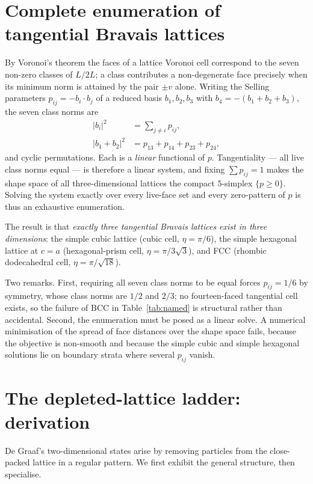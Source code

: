 \documentclass[aps,prl,twocolumn,superscriptaddress,floatfix]{revtex4-2}
\begin{document}
\section{Complete enumeration of tangential Bravais lattices}
\label{sec:enum}

By Voronoi's theorem the faces of a lattice Voronoi cell correspond to the seven
non-zero classes of $L/2L$; a class contributes a non-degenerate face precisely
when its minimum norm is attained by the pair $\pm v$ alone. Writing the Selling
parameters $p_{ij}=-b_i\cdot b_j$ of a reduced basis $b_1,b_2,b_3$ with
$b_4=-(b_1+b_2+b_3)$, the seven class norms are
\begin{align}
|b_i|^2 &= \textstyle\sum_{j\neq i} p_{ij},\\
|b_1+b_2|^2 &= p_{13}+p_{14}+p_{23}+p_{24},
\end{align}
and cyclic permutations. Each is a \emph{linear} functional of $p$. Tangentiality
--- all live class norms equal --- is therefore a linear system, and fixing
$\sum p_{ij}=1$ makes the shape space of all three-dimensional lattices the
compact $5$-simplex $\{p\geq0\}$. Solving the system exactly over every live-face
set and every zero-pattern of $p$ is thus an exhaustive enumeration.

The result is that \emph{exactly three tangential Bravais lattices exist in three
dimensions}: the simple cubic lattice (cubic cell, $\eta=\pi/6$), the simple
hexagonal lattice at $c=a$ (hexagonal-prism cell, $\eta=\pi/3\sqrt{3}$), and FCC
(rhombic dodecahedral cell, $\eta=\pi/\sqrt{18}$).

Two remarks. First, requiring all seven class norms to be equal forces
$p_{ij}=1/6$ by symmetry, whose class norms are $1/2$ and $2/3$; no fourteen-faced
tangential cell exists, so the failure of BCC in Table~\ref{tab:named} is
structural rather than accidental. Second, the enumeration must be posed as a
linear solve. A numerical minimisation of the spread of face distances over the
shape space fails, because the objective is non-smooth and because the simple
cubic and simple hexagonal solutions lie on boundary strata where several
$p_{ij}$ vanish.

\section{The depleted-lattice ladder: derivation}
\label{sec:ladder}

De Graaf's two-dimensional states arise by removing particles from the
close-packed lattice in a regular pattern. We first exhibit the general
structure, then specialise.
\end{document}
